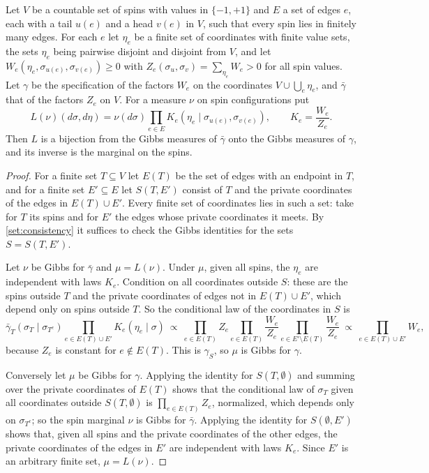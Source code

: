 \begin{lemma}[Elimination]\label{pay:elim}
Let $V$ be a countable set of spins with values in $\{-1,+1\}$ and $E$ a set of edges $e$, each with a tail $u(e)$ and a head $v(e)$ in $V$, such that every spin lies in finitely many edges. For each $e$ let $\eta_e$ be a finite set of coordinates with finite value sets, the sets $\eta_e$ being pairwise disjoint and disjoint from $V$, and let $W_e(\eta_e,\sigma_{u(e)},\sigma_{v(e)})\ge0$ with $Z_e(\sigma_u,\sigma_v)=\sum_{\eta_e}W_e>0$ for all spin values. Let $\gamma$ be the specification of the factors $W_e$ on the coordinates $V\cup\bigcup_e\eta_e$, and $\bar\gamma$ that of the factors $Z_e$ on $V$. For a measure $\nu$ on spin configurations put
\[
L(\nu)(d\sigma,d\eta)=\nu(d\sigma)\prod_{e\in E}K_e(\eta_e\mid\sigma_{u(e)},\sigma_{v(e)}),\qquad K_e=\frac{W_e}{Z_e}.
\]
Then $L$ is a bijection from the Gibbs measures of $\bar\gamma$ onto the Gibbs measures of $\gamma$, and its inverse is the marginal on the spins.
\end{lemma}

\begin{proof}
For a finite set $T\subseteq V$ let $E(T)$ be the set of edges with an endpoint in $T$, and for a finite set $E'\subseteq E$ let $S(T,E')$ consist of $T$ and the private coordinates of the edges in $E(T)\cup E'$. Every finite set of coordinates lies in such a set: take for $T$ its spins and for $E'$ the edges whose private coordinates it meets. By \cref{set:consistency} it suffices to check the Gibbs identities for the sets $S=S(T,E')$.

Let $\nu$ be Gibbs for $\bar\gamma$ and $\mu=L(\nu)$. Under $\mu$, given all spins, the $\eta_e$ are independent with laws $K_e$. Condition on all coordinates outside $S$: these are the spins outside $T$ and the private coordinates of edges not in $E(T)\cup E'$, which depend only on spins outside $T$. So the conditional law of the coordinates in $S$ is
\[
\bar\gamma_T(\sigma_T\mid\sigma_{T^c})\prod_{e\in E(T)\cup E'}K_e(\eta_e\mid\sigma)\ \propto\ \prod_{e\in E(T)}Z_e\prod_{e\in E(T)}\frac{W_e}{Z_e}\prod_{e\in E'\setminus E(T)}\frac{W_e}{Z_e}\ \propto\ \prod_{e\in E(T)\cup E'}W_e,
\]
because $Z_e$ is constant for $e\notin E(T)$. This is $\gamma_S$, so $\mu$ is Gibbs for $\gamma$.

Conversely let $\mu$ be Gibbs for $\gamma$. Applying the identity for $S(T,\emptyset)$ and summing over the private coordinates of $E(T)$ shows that the conditional law of $\sigma_T$ given all coordinates outside $S(T,\emptyset)$ is $\prod_{e\in E(T)}Z_e$, normalized, which depends only on $\sigma_{T^c}$; so the spin marginal $\nu$ is Gibbs for $\bar\gamma$. Applying the identity for $S(\emptyset,E')$ shows that, given all spins and the private coordinates of the other edges, the private coordinates of the edges in $E'$ are independent with laws $K_e$. Since $E'$ is an arbitrary finite set, $\mu=L(\nu)$.
\end{proof}

